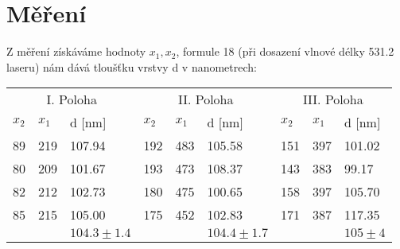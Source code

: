 \documentclass[czech,11pt,a4paper]{article}
\begin{document}
		\section{Měření}
		Z měření získáváme hodnoty $x_1, x_2$, formule 18 (při dosazení vlnové délky 531.2 laseru) nám dává tloušťku vrstvy d v nanometrech:
		
		\begin{center}
			\begin{tabular}{lll|lll|lll}
			\multicolumn{3}{c}{I. Poloha} & \multicolumn{3}{c}{II. Poloha} & \multicolumn{3}{c}{III. Poloha} \\ $x_2$    & $x_1$    &  d [nm]            & $x_2$    & $x_1$    &   d [nm]             & $x_2$     & $x_1$    &   d [nm]             \\ \hline
			89    & 219   & 107.94        & 192   & 483   & 105.58         & 151    & 397   & 101.02         \\
			80    & 209   & 101.67        & 193   & 473   & 108.37         & 143    & 383   & 99.17         \\
			82    & 212   & 102.73        & 180   & 475   & 100.65         & 158    & 397   & 105.70         \\
			85    & 215   & 105.00        & 175   & 452   & 102.83         & 171    & 387   & 117.35         \\ \hline
			&       & $104.3 \pm 1.4 $   &       &       & $104.4 \pm 1.7$   &        &       & $105 \pm 4$  
		\end{tabular}
		\end{center}
		
\end{document}
